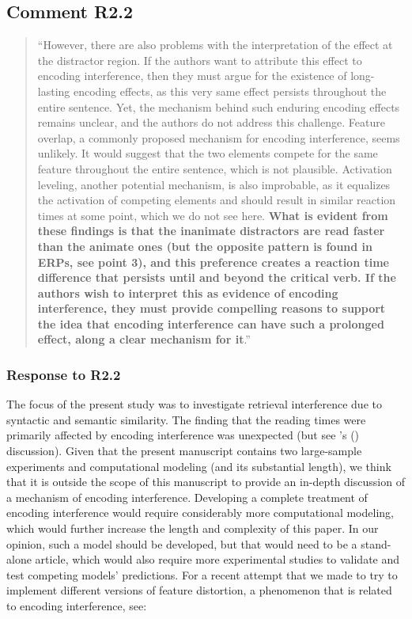 \documentclass[12pt]{article}
\begin{document}
\subsection*{Comment R2.2}
\begin{quote}
``However, there are also problems with the interpretation of the effect at the distractor region. If the authors want to attribute this effect to encoding interference, then they must argue for the existence of long-lasting encoding effects, as this very same effect persists throughout the entire sentence. Yet, the mechanism behind such enduring encoding effects remains unclear, and the authors do not address this challenge. Feature overlap, a commonly proposed mechanism for encoding interference, seems unlikely. It would suggest that the two elements compete for the same feature throughout the entire sentence, which is not plausible. Activation leveling, another potential mechanism, is also improbable, as it equalizes the activation of competing elements and should result in similar reaction times at some point, which we do not see here. \textbf{What is evident from these findings is that the inanimate distractors are read faster than the animate ones (but the opposite pattern is found in ERPs, see point 3), and this preference creates a reaction time difference that persists until and beyond the critical verb. If the authors wish to interpret this as evidence of encoding interference, they must provide compelling reasons to support the idea that encoding interference can have such a prolonged effect, along a clear mechanism for it}.''
\end{quote}

\subsubsection*{Response to R2.2}
The focus of the present study was to investigate retrieval interference due to syntactic and semantic similarity. The finding that the reading times were primarily affected by encoding interference was unexpected (but see \citeauthor{mertzen}'s (\citeyear{mertzen}) discussion). Given that the present manuscript contains two large-sample experiments and computational modeling (and its substantial length), we think that it is outside the scope of this manuscript to provide an in-depth discussion of a mechanism of encoding interference. Developing a complete treatment of encoding interference would require considerably more computational modeling, which would further increase the length and complexity of this paper. In our opinion, such a model should be developed, but that would need to be a stand-alone article, which would also require more experimental studies to validate and test competing models' predictions. For a recent attempt that we made to try to implement different versions of feature distortion, a phenomenon that is related to encoding interference, see:
\end{document}

